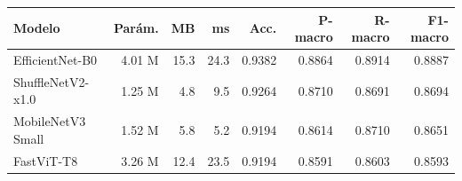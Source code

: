 \begin{tabular}{lrrrrrrr}
\toprule
\textbf{Modelo} & \textbf{Parám.} & \textbf{MB} & \textbf{ms} & \textbf{Acc.} & \textbf{P-macro} & \textbf{R-macro} & \textbf{F1-macro} \\
\midrule
EfficientNet-B0 & 4.01 M & 15.3 & 24.3 & 0.9382 & 0.8864 & 0.8914 & 0.8887 \\
ShuffleNetV2-x1.0 & 1.25 M & 4.8 & 9.5 & 0.9264 & 0.8710 & 0.8691 & 0.8694 \\
MobileNetV3 Small & 1.52 M & 5.8 & 5.2 & 0.9194 & 0.8614 & 0.8710 & 0.8651 \\
FastViT-T8 & 3.26 M & 12.4 & 23.5 & 0.9194 & 0.8591 & 0.8603 & 0.8593 \\
\bottomrule
\end{tabular}
